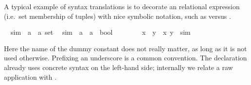 \begin{isabellebody}
\begin{isamarkuptext}
  \medskip A typical example of syntax translations is to decorate an
  relational expression (i.e.\ set membership of tuples) with nice
  symbolic notation, such as  versus .%
\end{isamarkuptext}%
\isamarkuptrue%
\isanewline
\ \ sim\ {\isacharcolon}{\isacharcolon}\ {\isachardoublequote}{\isacharparenleft}{\isacharprime}a\ {\isasymtimes}\ {\isacharprime}a{\isacharparenright}\ set{\isachardoublequote}\isanewline
\isanewline
\isamarkupfalse%
\isanewline
\ \ {\isachardoublequote}{\isacharunderscore}sim{\isachardoublequote}\ {\isacharcolon}{\isacharcolon}\ {\isachardoublequote}{\isacharprime}a\ {\isasymRightarrow}\ {\isacharprime}a\ {\isasymRightarrow}\ bool{\isachardoublequote}\ \ \ \ {\isacharparenleft}\ {\isachardoublequote}{\isasymapprox}{\isachardoublequote}\ {}{}{\isacharparenright}\isanewline
\isamarkupfalse%
\isanewline
\ \ {\isachardoublequote}x\ {\isasymapprox}\ y{\isachardoublequote}\ {\isasymrightleftharpoons}\ {\isachardoublequote}{\isacharparenleft}x{\isacharcomma}\ y{\isacharparenright}\ {\isasymin}\ sim{\isachardoublequote}\isamarkupfalse%
%
\begin{isamarkuptext}%
\noindent Here the name of the dummy constant  does
  not really matter, as long as it is not used otherwise.  Prefixing
  an underscore is a common convention.  The 
  declaration already uses concrete syntax on the left-hand side;
  internally we relate a raw application  with
  .


\end{isamarkuptext}
\end{isabellebody}
